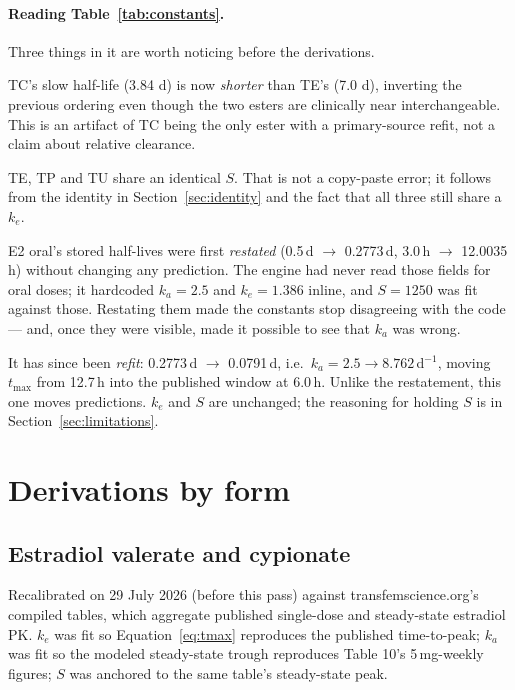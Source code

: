 \documentclass[11pt,a4paper]{article}
\begin{document}
\paragraph{Reading Table~\ref{tab:constants}.} Three things in it are worth
noticing before the derivations.

TC's slow half-life (3.84 d) is now \emph{shorter} than TE's (7.0 d), inverting
the previous ordering even though the two esters are clinically near
interchangeable. This is an artifact of TC being the only ester with a
primary-source refit, not a claim about relative clearance.

TE, TP and TU share an identical $S$. That is not a copy-paste error; it follows
from the identity in Section~\ref{sec:identity} and the fact that all three still
share a $k_e$.

E2 oral's stored half-lives were first \emph{restated} (0.5\,d $\to$ 0.2773\,d,
3.0\,h $\to$ 12.0035\,h) without changing any prediction. The engine had never
read those fields for oral doses; it hardcoded $k_a = 2.5$ and $k_e = 1.386$
inline, and $S = 1250$ was fit against those. Restating them made the constants
stop disagreeing with the code --- and, once they were visible, made it possible
to see that $k_a$ was wrong.

It has since been \emph{refit}: 0.2773\,d $\to$ 0.0791\,d, i.e.\ $k_a = 2.5 \to
8.762$\,d$^{-1}$, moving $t_{\max}$ from 12.7\,h into the published window at
6.0\,h. Unlike the restatement, this one moves predictions. $k_e$ and $S$ are
unchanged; the reasoning for holding $S$ is in Section~\ref{sec:limitations}.

\section{Derivations by form}

\subsection{Estradiol valerate and cypionate}

Recalibrated on 29 July 2026 (before this pass) against
transfemscience.org's compiled tables, which aggregate published single-dose and
steady-state estradiol PK. $k_e$ was fit so Equation~\ref{eq:tmax} reproduces the
published time-to-peak; $k_a$ was fit so the modeled steady-state trough
reproduces Table 10's 5\,mg-weekly figures; $S$ was anchored to the same table's
steady-state peak.
\end{document}
